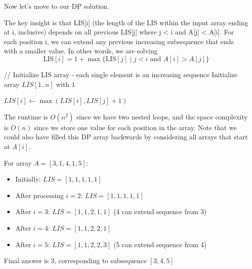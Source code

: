   Now let's move to our DP solution. 

  \begin{algo}
    The key insight is that LIS[i] (the length of the LIS within the input array ending at i, inclusive) depends on all previous LIS[j] where j < i and A[j] < A[i]. For each position i, we can extend any previous increasing subsequence that ends with a smaller value. In other words, we are solving 
    \begin{equation}
      \mathrm{LIS}[i] = 1 + \max\{\mathrm{LIS}[j] \mid j < i \text{ and } A[i] > A[j] \}
    \end{equation}

    \begin{algorithm}[H]
      \caption{Dynamic Programming Longest Increasing Subsequence}
      \label{alg:dplis}
      \begin{algorithmic}
          \State // Initialize LIS array - each single element is an increasing sequence
          \State Initialize array $LIS[1..n]$ with $1$  
          
            
              
                
                \State $LIS[i] \gets \max(LIS[i], LIS[j] + 1)$  
              \EndIf
            \EndFor
          \EndFor
          
          \State {} 
        \EndFunction
      \end{algorithmic}
    \end{algorithm}

    The runtime is $O(n^2)$ since we have two nested loops, and the space complexity is $O(n)$ since we store one value for each position in the array. Note that we could also have filled this DP array backwards by considering all arrays that start at $A[i]$. 
  \end{algo}

  \begin{example}
    \label{ex:dplis-for-small-array}
    For array $A = [3,1,4,1,5]$:
    \begin{itemize}
      \item Initially: $LIS = [1,1,1,1,1]$
      \item After processing $i=2$: $LIS = [1,1,1,1,1]$
      \item After $i=3$: $LIS = [1,1,2,1,1]$ (4 can extend sequence from 3)
      \item After $i=4$: $LIS = [1,1,2,2,1]$
      \item After $i=5$: $LIS = [1,1,2,2,3]$ (5 can extend sequence from 4)
    \end{itemize}
    Final answer is 3, corresponding to subsequence $[3,4,5]$
  \end{example}

